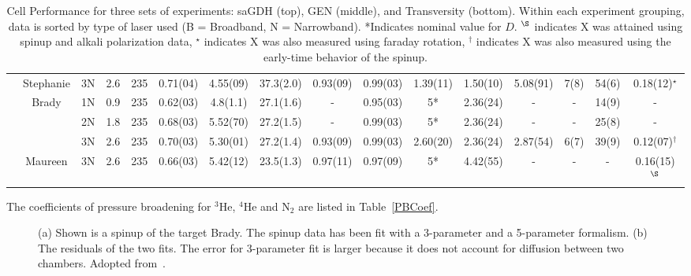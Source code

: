 \documentclass[pdftex,letterpaper,12pt]{report}
\begin{document}
\begin{table}
\begin{center}
\begin{tabular}{|c|c|ccc|ccc|ccccc|cc|c|}
			\cline{2-16}
			& Stephanie & 3N & 2.6 & 235 & 0.71(04) & 4.55(09) & 37.3(2.0) & 0.93(09) & 0.99(03) & 1.39(11) & 1.50(10) & 5.08(91) & 7(8) & 54(6) & 0.18(12)$^\star$\\
			\cline{2-16}
			& \multirow{3}{*}{Brady} & 1N & 0.9 & 235 & 0.62(03) & 4.8(1.1) & 27.1(1.6) & - & 0.95(03) & 5* & 2.36(24) & -  & - & 14(9) & -\\
			& & 2N & 1.8 & 235 & 0.68(03) & 5.52(70) & 27.2(1.5) & - & 0.99(03) & 5* & 2.36(24) & - & - & 25(8) & -\\
			& & 3N & 2.6 & 235 & 0.70(03) & 5.30(01) & 27.2(1.4) & 0.93(09) & 0.99(03) & 2.60(20) & 2.36(24) & 2.87(54) & 6(7) & 39(9) & 0.12(07)$^\dagger$\\
			\cline{2-16}
			& Maureen & 3N & 2.6 & 235 & 0.66(03) & 5.42(12) & 23.5(1.3) & 0.97(11) & 0.97(09) & 5* & 4.42(55) & - & - & - & 0.16(15)$^\S$\\
			\hline
		\end{tabular}
	\end{center}
	\caption{Cell Performance for three sets of experiments: saGDH (top), GEN (middle), and Transversity (bottom).  Within each experiment grouping, data is sorted by type of laser used (B = Broadband, N = Narrowband).  *Indicates nominal value for $D$.  $^\S$ indicates X was attained using spinup and alkali polarization data, $^\star$ indicates X was also measured using faraday rotation, $^\dagger$ indicates X was also measured using the early-time behavior of the spinup.}
	\label{table:CellTable}
\end{table}

The coefficients of pressure broadening for $^{3}$He, $^{4}$He and N$_{2}$ are listed in Table~\ref{PBCoef}.

\begin{figure}[H]
	\label{spinup}
	\centering
	\caption{{(a) Shown is a spinup of the target Brady. The spinup data has been fit with a 3-parameter and a 5-parameter formalism. (b) The residuals of the two fits. The error for 3-parameter fit is larger because it does not account for diffusion between two chambers. Adopted from~\cite{PhysRevC.91.055205}.}}
\end{figure}
	
\end{document}
